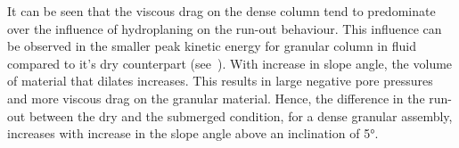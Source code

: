 It can be seen that the viscous drag on the dense column tend to predominate 
over the influence of hydroplaning on the run-out behaviour. This influence can 
be observed in the smaller peak kinetic energy for granular column in fluid 
compared to it's dry counterpart (see~). With increase in 
slope angle, the volume of material that dilates increases. This results in 
large negative pore pressures and more viscous drag on the granular material. 
Hence, the difference in the run-out between the dry and the submerged 
condition, for a dense granular assembly, increases with increase in the slope 
angle above an inclination of 5\si{\degree}.


\begin{figure}
\\

\\


\end{figure}
